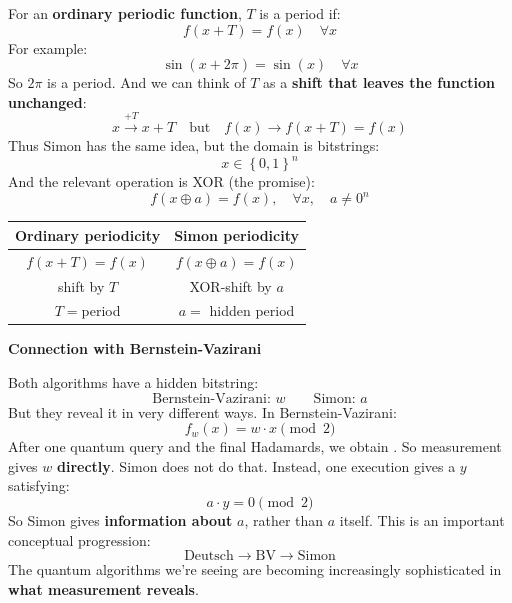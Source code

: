 \highspace
For an \textbf{ordinary periodic function}, $T$ is a period if:
\begin{equation*}
    f(x + T) = f(x) \quad \forall x
\end{equation*}
For example:
\begin{equation*}
    \sin(x + 2\pi) = \sin(x) \quad \forall x
\end{equation*}
So $2\pi$ is a period. And we can think of $T$ as a \textbf{shift that leaves the function unchanged}:
\begin{equation*}
    x \xrightarrow{+T} x + T \quad \text{but} \quad f(x) \to f(x + T) = f(x)
\end{equation*}
Thus Simon has the same idea, but the domain is bitstrings:
\begin{equation*}
    x \in \left\{0,1\right\}^n
\end{equation*}
And the relevant operation is XOR (the promise):
\begin{equation*}
    f(x \oplus a) = f(x), \quad \forall x, \quad a \neq 0^n
\end{equation*}
\begin{center}
    \begin{tabular}{@{} c | c @{}}
        \toprule
        Ordinary periodicity & Simon periodicity \\
        \midrule
        $f(x + T) = f(x)$ & $f(x \oplus a) = f(x)$ \\
        shift by $T$ & XOR-shift by $a$ \\
        $T = $period & $a = $ hidden period \\
        \bottomrule
    \end{tabular}
\end{center}

\highspace
\begin{flushleft}
    \textcolor{Green3}{ \textbf{Connection with Bernstein-Vazirani}}
\end{flushleft}
Both algorithms have a hidden bitstring:
\begin{equation*}
    \text{Bernstein-Vazirani: } w \qquad \text{Simon: } a
\end{equation*}
But they reveal it in very different ways. In Bernstein-Vazirani:
\begin{equation*}
    f_w (x) = w \cdot x \pmod 2
\end{equation*}
After one quantum query and the final Hadamards, we obtain . So measurement gives $w$ \textbf{directly}. Simon does not do that. Instead, one execution gives a $y$ satisfying:
\begin{equation*}
    a \cdot y = 0 \pmod 2
\end{equation*}
So Simon gives \textbf{information about} $a$, rather than $a$ itself. This is an important conceptual progression:
\begin{equation*}
    \text{Deutsch} \to \text{BV} \to \text{Simon}
\end{equation*}
The quantum algorithms we're seeing are becoming increasingly sophisticated in \textbf{what measurement reveals}.

